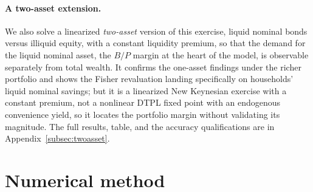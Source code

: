 \documentclass[12pt]{article}
\begin{document}
\paragraph{A two-asset extension.} We also solve a
linearized \emph{two-asset} version of this exercise, liquid nominal bonds
versus illiquid equity, with a constant liquidity premium, so that the
demand for the liquid nominal asset, the $B/P$ margin at the heart of the model,
is observable separately from total wealth. It confirms the one-asset findings
under the richer portfolio and shows the Fisher revaluation landing specifically
on households' liquid nominal savings; but it is a linearized New Keynesian
exercise with a constant premium, not a nonlinear DTPL fixed point with an
endogenous convenience yield, so it locates the portfolio margin without
validating its magnitude. The full results, table, and the accuracy
qualifications are in Appendix~\ref{subsec:twoasset}.


\section{Numerical method}\label{app:numerics}
\end{document}
